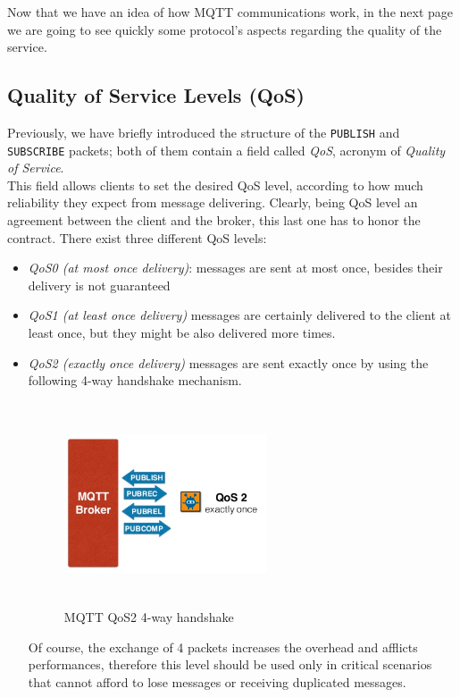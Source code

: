 \documentclass[12pt]{report}
\begin{document}
{\setlength{\parindent}{0cm}
Now that we have an idea of how MQTT communications work, in the next page we are going to see quickly some protocol's aspects regarding the quality of the service.
}

\clearpage

\subsection{Quality of Service Levels (QoS)}

\bigskip
Previously, we have briefly introduced the structure of the \texttt{PUBLISH} and \texttt{SUBSCRIBE} packets; both of them contain a field called \emph{QoS}, acronym of \emph{Quality of Service}.\\
This field allows clients to set the desired QoS level, according to how much reliability they expect from message delivering.
Clearly, being QoS level an agreement between the client and the broker, this last one has to honor the contract.
There exist three different QoS levels:

\begin{itemize}
\setlength{\itemindent}{+4mm}
\item \emph{QoS0 (at most once delivery)}: messages are sent at most once, besides their delivery is not guaranteed
\item \emph{QoS1 (at least once delivery)} messages are certainly delivered to the client at least once, but they might be also delivered more times.
\item \emph{QoS2 (exactly once delivery)} messages are sent exactly once by using the following 4-way handshake mechanism.

\begin{figure}[H]
\includegraphics[width=6cm,height=6cm,keepaspectratio]{mqtt_qos2}
\centering
\caption{MQTT QoS2 4-way handshake}
\end{figure}
Of course, the exchange of 4 packets increases the overhead and afflicts performances, therefore this level should be used only in critical scenarios that cannot afford to lose messages or receiving duplicated messages.\\

\end{itemize}
\end{document}
